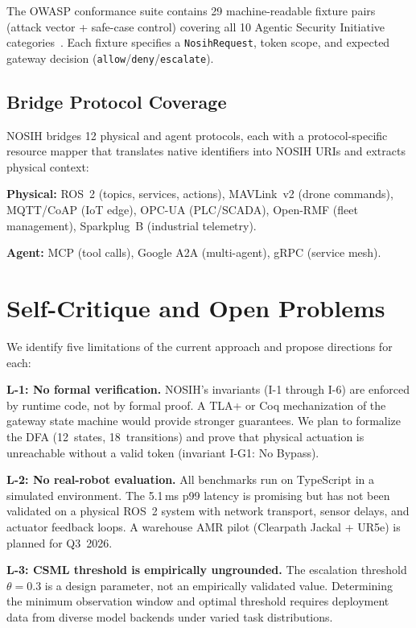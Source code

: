 \documentclass[conference]{IEEEtran}
\begin{document}
The OWASP conformance suite contains 29 machine-readable fixture pairs
(attack vector + safe-case control) covering all 10 Agentic Security
Initiative categories~\cite{owasp-asi}.
Each fixture specifies a \texttt{NosihRequest}, token scope, and expected
gateway decision (\texttt{allow}/\texttt{deny}/\texttt{escalate}).

\subsection{Bridge Protocol Coverage}

NOSIH bridges 12 physical and agent protocols, each with a protocol-specific
resource mapper that translates native identifiers into NOSIH URIs and extracts
physical context:

\smallskip
\noindent
\textbf{Physical:} ROS~2 (topics, services, actions), MAVLink~v2 (drone
commands), MQTT/CoAP (IoT edge), OPC-UA (PLC/SCADA), Open-RMF (fleet
management), Sparkplug~B (industrial telemetry).

\noindent
\textbf{Agent:} MCP (tool calls), Google A2A (multi-agent), gRPC (service mesh).

\section{Self-Critique and Open Problems}
\label{sec:critique}

We identify five limitations of the current approach and propose directions
for each:

\textbf{L-1: No formal verification.}
NOSIH's invariants (I-1 through I-6) are enforced by runtime code, not by
formal proof.
A TLA+ or Coq mechanization of the gateway state machine would provide
stronger guarantees.
We plan to formalize the DFA (12~states, 18~transitions) and prove that
physical actuation is unreachable without a valid token (invariant I-G1:
No Bypass).

\textbf{L-2: No real-robot evaluation.}
All benchmarks run on TypeScript in a simulated environment.
The 5.1\,ms p99 latency is promising but has not been validated on a physical
ROS~2 system with network transport, sensor delays, and actuator feedback loops.
A warehouse AMR pilot (Clearpath Jackal + UR5e) is planned for Q3~2026.

\textbf{L-3: CSML threshold is empirically ungrounded.}
The escalation threshold $\theta = 0.3$ is a design parameter, not an
empirically validated value.
Determining the minimum observation window and optimal threshold requires
deployment data from diverse model backends under varied task distributions.
\end{document}
